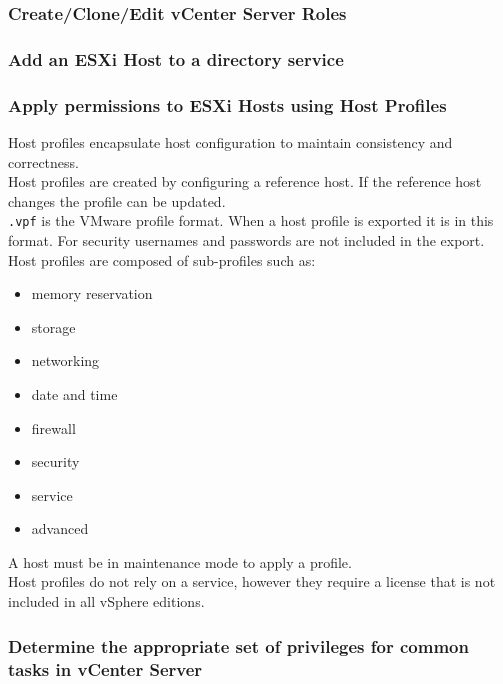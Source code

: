 \subsubsection{Create/Clone/Edit vCenter Server Roles}

\subsubsection{Add an ESXi Host to a directory service}

\subsubsection{Apply permissions to ESXi Hosts using Host Profiles}

Host profiles encapsulate host configuration to maintain consistency and
correctness.\\

Host profiles are created by configuring a reference host. If the reference
host changes the profile can be updated.\\

\texttt{.vpf} is the VMware profile format. When a host profile is exported
it is in this format. For security usernames and passwords are not included
in the export.\\

Host profiles are composed of sub-profiles such as:

\begin{itemize}
\item memory reservation
\item storage
\item networking
\item date and time
\item firewall
\item security
\item service
\item advanced
\end{itemize}

A host must be in maintenance mode to apply a profile.\\

Host profiles do not rely on a service, however they require a license that
is not included in all vSphere editions.

\subsubsection{Determine the appropriate set of privileges for common tasks in vCenter Server}
